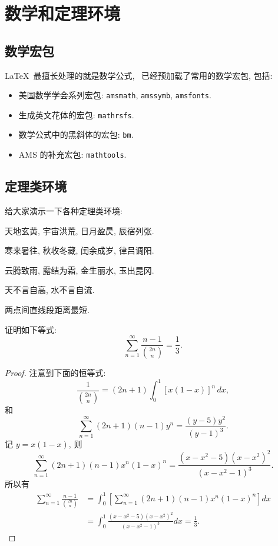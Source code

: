 \chapter{数学和定理环境}
\label{cha:theorem}
\section{数学宏包}
\LaTeX\ 最擅长处理的就是数学公式, \shuthesis\ 已经预加载了常用的数学宏包, 包括:
\begin{itemize}
\item 美国数学学会系列宏包: \texttt{amsmath}, \texttt{amssymb}, \texttt{amsfonts}.
\item 生成英文花体的宏包: \texttt{mathrsfs}.
\item 数学公式中的黑斜体的宏包: \texttt{bm}.
\item AMS 的补充宏包: \texttt{mathtools}.
\end{itemize}

\section{定理类环境}
给大家演示一下各种定理类环境:

\begin{assumption}
天地玄黄, 宇宙洪荒, 日月盈昃, 辰宿列张.
\end{assumption}

\begin{definition}
寒来暑往, 秋收冬藏, 闰余成岁, 律吕调阳.
\end{definition}

\begin{proposition}
云腾致雨, 露结为霜, 金生丽水, 玉出昆冈.
\end{proposition}

\begin{remark}
天不言自高, 水不言自流.
\end{remark}

\begin{axiom}
两点间直线段距离最短.  
\end{axiom}

\begin{lemma}
证明如下等式:
\[
\sum_{n=1}^{\infty}\frac{n-1}{\binom{2n}{n}}=\frac{1}{3}.
\]
\end{lemma}

\begin{proof}
注意到下面的恒等式:
\[
\frac{1}{\binom{2n}{n}}=(2n+1)\int_0^1[x(1-x)]^n\,dx,
\]
和
\[
\sum_{n=1}^{\infty}(2n+1)(n-1)y^n=\frac{(y-5)y^2}{(y-1)^3}.
\]
记 $y=x(1-x)$, 则
\[
\sum_{n=1}^{\infty}(2n+1)(n-1)x^n(1-x)^n=\frac{(x-x^2-5)(x-x^2)^2}{(x-x^2-1)^3}.
\]
所以有
\begin{align*}
\sum_{n=1}^{\infty}\frac{n-1}{\binom{2n}{n}} & =
\int_0^1\left[\sum_{n=1}^{\infty}(2n+1)(n-1)x^n(1-x)^n\right]dx\\
& =\int_0^1\frac{(x-x^2-5)(x-x^2)^2}{(x-x^2-1)^3}dx=\frac13.
\end{align*}
\end{proof}

